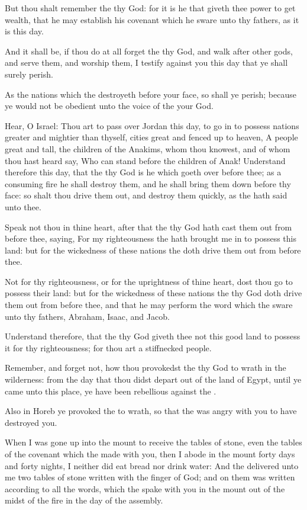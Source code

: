 \Verse But thou shalt remember the \LORD thy God: for it is he that giveth thee power to get wealth, that he may establish his covenant which he sware unto thy fathers, as it is this day.

\Verse And it shall be, if thou do at all forget the \LORD thy God, and walk after other gods, and serve them, and worship them, I testify against you this day that ye shall surely perish.

\Verse As the nations which the \LORD destroyeth before your face, so shall ye perish; because ye would not be obedient unto the voice of the \LORD your God.


\Chapter
\Verse Hear, O Israel: Thou art to pass over Jordan this day, to go in to possess nations greater and mightier than thyself, cities great and fenced up to heaven, \Verse A people great and tall, the children of the Anakims, whom thou knowest, and of whom thou hast heard say, Who can stand before the children of Anak!  \Verse Understand therefore this day, that the \LORD thy God is he which goeth over before thee; as a consuming fire he shall destroy them, and he shall bring them down before thy face: so shalt thou drive them out, and destroy them quickly, as the \LORD hath said unto thee.

\Verse Speak not thou in thine heart, after that the \LORD thy God hath cast them out from before thee, saying, For my righteousness the \LORD hath brought me in to possess this land: but for the wickedness of these nations the \LORD doth drive them out from before thee.

\Verse Not for thy righteousness, or for the uprightness of thine heart, dost thou go to possess their land: but for the wickedness of these nations the \LORD thy God doth drive them out from before thee, and that he may perform the word which the \LORD sware unto thy fathers, Abraham, Isaac, and Jacob.

\Verse Understand therefore, that the \LORD thy God giveth thee not this good land to possess it for thy righteousness; for thou art a stiffnecked people.

\Verse Remember, and forget not, how thou provokedst the \LORD thy God to wrath in the wilderness: from the day that thou didst depart out of the land of Egypt, until ye came unto this place, ye have been rebellious against the \LORD.

\Verse Also in Horeb ye provoked the \LORD to wrath, so that the \LORD was angry with you to have destroyed you.

\Verse When I was gone up into the mount to receive the tables of stone, even the tables of the covenant which the \LORD made with you, then I abode in the mount forty days and forty nights, I neither did eat bread nor drink water: \Verse And the \LORD delivered unto me two tables of stone written with the finger of God; and on them was written according to all the words, which the \LORD spake with you in the mount out of the midst of the fire in the day of the assembly.

